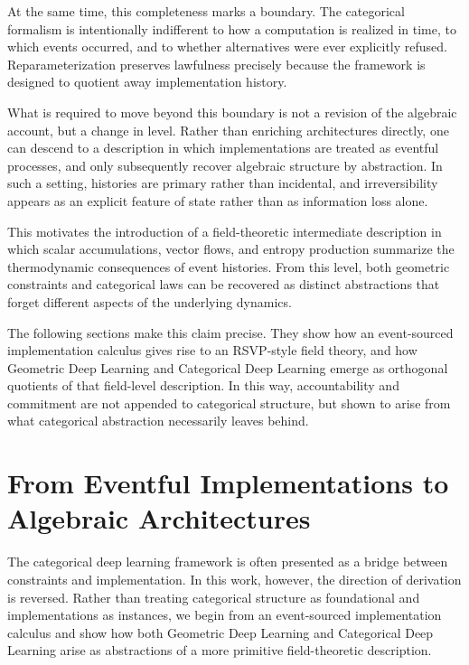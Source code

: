 \documentclass[11pt]{article}
\begin{document}
At the same time, this completeness marks a boundary. The categorical formalism
is intentionally indifferent to how a computation is realized in time, to which
events occurred, and to whether alternatives were ever explicitly refused.
Reparameterization preserves lawfulness precisely because the framework is
designed to quotient away implementation history.

What is required to move beyond this boundary is not a revision of the algebraic
account, but a change in level. Rather than enriching architectures directly,
one can descend to a description in which implementations are treated as
eventful processes, and only subsequently recover algebraic structure by
abstraction. In such a setting, histories are primary rather than incidental,
and irreversibility appears as an explicit feature of state rather than as
information loss alone.

This motivates the introduction of a field-theoretic intermediate description
in which scalar accumulations, vector flows, and entropy production summarize
the thermodynamic consequences of event histories. From this level, both
geometric constraints and categorical laws can be recovered as distinct
abstractions that forget different aspects of the underlying dynamics.

The following sections make this claim precise. They show how an event-sourced
implementation calculus gives rise to an RSVP-style field theory, and how
Geometric Deep Learning and Categorical Deep Learning emerge as orthogonal
quotients of that field-level description. In this way, accountability and
commitment are not appended to categorical structure, but shown to arise from
what categorical abstraction necessarily leaves behind.


\section{From Eventful Implementations to Algebraic Architectures}

The categorical deep learning framework is often presented as a bridge between
constraints and implementation. In this work, however, the direction of
derivation is reversed. Rather than treating categorical structure as
foundational and implementations as instances, we begin from an
event-sourced implementation calculus and show how both Geometric Deep Learning
and Categorical Deep Learning arise as abstractions of a more primitive
field-theoretic description.
\end{document}
